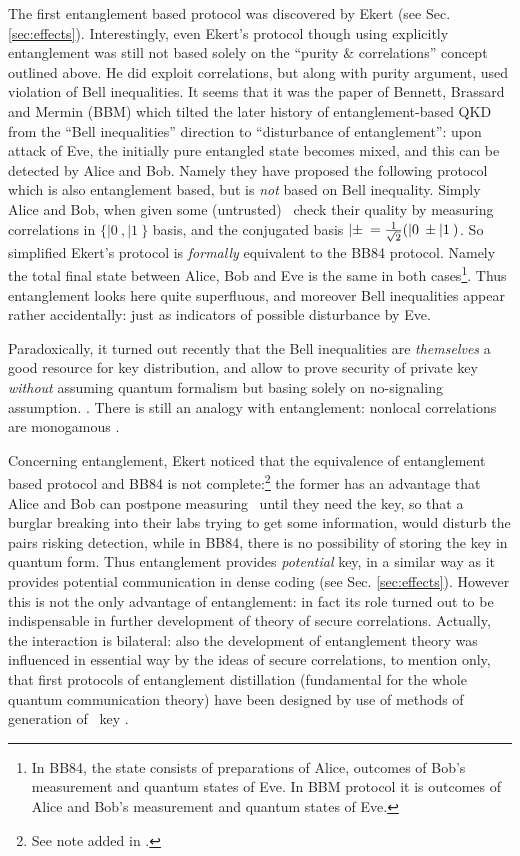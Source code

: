 \documentclass[rmp,12pt,preprint]{revtex4-2}
\begin{document}
The first entanglement based protocol was discovered by Ekert (see
Sec. \ref{sec:effects}). Interestingly, even Ekert's protocol though
using explicitly entanglement was still not based solely on the
``purity \& correlations'' concept outlined above. He did exploit
correlations, but along with purity argument, used violation of Bell
inequalities. It seems that it was the paper of Bennett, Brassard and
Mermin (BBM) \cite{BBM92} which tilted the later history of
entanglement-based QKD from the ``Bell inequalities'' direction to
``disturbance of entanglement'': upon attack of Eve, the
initially pure entangled state becomes mixed, and this can be detected
by Alice and Bob. Namely they have proposed the following protocol
which is also entanglement based, but is {\it not} based on Bell
inequality. Simply Alice and Bob, when given some (untrusted)
\eprpairs\ check their quality by measuring correlations in
$\{|0\>,|1\>\}$ basis, and the conjugated basis
$|\pm\>={1\over \sqrt2}(|0\>\pm|1\>)$. So
simplified Ekert's protocol is {\it formally} equivalent to the BB84
protocol. Namely the total final state between Alice, Bob and Eve is
the same in both cases\footnote{In BB84, the state consists of
  preparations of Alice, outcomes of Bob's measurement and quantum
  states of Eve. In BBM protocol it is outcomes of Alice and Bob's
  measurement and quantum states of Eve.}. Thus entanglement looks
here quite superfluous, and moreover Bell inequalities appear rather
accidentally: just as indicators of possible disturbance by Eve.

Paradoxically, it turned out recently that the Bell inequalities are
{\it themselves} a good resource for key distribution, and allow to
prove security of private key {\it without} assuming quantum formalism
but basing solely on no-signaling
assumption. \cite{AcinGM-bellqkd,BHK_Bell_key,MW_Bellcrypto}. There is
still an analogy with entanglement: nonlocal correlations are
monogamous \cite{BKP_Bellcrypto}.

Concerning entanglement, Ekert noticed that the equivalence of
entanglement based protocol and BB84 is not complete:\footnote{See
  note added in \cite{BBM92}.} the former has an advantage that Alice
and Bob can postpone measuring \eprpairs\ until they need the key, so
that a burglar breaking into their labs trying to get some
information, would disturb the pairs risking detection, while in BB84,
there is no possibility of storing the key in quantum form.  Thus
entanglement provides {\it potential} key, in a similar way as it
provides potential communication in dense coding (see Sec.
\ref{sec:effects}). However this is not the only advantage of
entanglement: in fact its role turned out to be
indispensable in further development of theory of secure
correlations. Actually, the interaction is bilateral: also the development
of entanglement theory was influenced in essential way by the ideas of
secure correlations, to mention only, that first protocols of
entanglement distillation (fundamental for the whole quantum
communication theory) have been designed by use of methods of
generation of \secure\ key \cite{BBPSSW1996,BDSW1996}.
\end{document}
